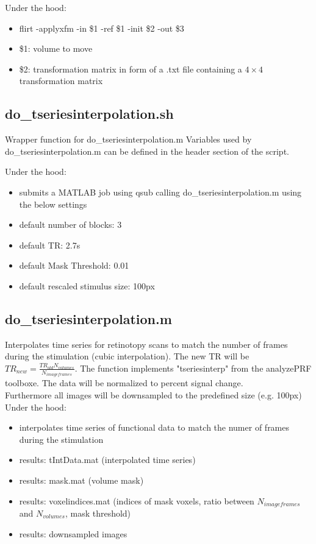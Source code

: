 \documentclass[12pt,a4paper]{scrartcl}
\begin{document}
\noindent Under the hood:
\begin{itemize}
\item flirt -applyxfm -in \$1 -ref \$1 -init \$2 -out \$3
\item \$1: volume to move
\item \$2: transformation matrix in form of a .txt file containing a $4\times4$ transformation matrix
\end{itemize}

\subsection{do\_tseriesinterpolation.sh}
\label{sec:tseriesinterp}
Wrapper function for do\_tseriesinterpolation.m Variables used by do\_tseriesinterpolation.m can be defined in the header section of the script.

\noindent Under the hood:
\begin{itemize}
\item submits a MATLAB job using qsub calling do\_tseriesinterpolation.m using the below settings
\item default number of blocks: 3
\item default TR: 2.7s
\item default Mask Threshold: 0.01
\item default rescaled stimulus size: 100px
\end{itemize}

\subsection{do\_tseriesinterpolation.m}
Interpolates time series for retinotopy scans to match the number of frames during the stimulation (cubic interpolation). The new TR will be $TR_{new}=\frac{TR_{old}N_{volumes}}{N_{imageframes}}$. The function implements "tseriesinterp" from the analyzePRF toolboxe. The data will be normalized to percent signal change.\\

\noindent Furthermore all images will be downsampled to the predefined size (e.g. 100px)\\

\noindent Under the hood:
\begin{itemize}
\item interpolates time series of functional data to match the numer of frames during the stimulation
\item results: tIntData.mat (interpolated time series)
\item results: mask.mat (volume mask)
\item results: voxelindices.mat (indices of mask voxels, ratio between $N_{imageframes}$ and $N_{volumes}$, mask threshold)
\item results: downsampled images
\end{itemize}
\end{document}

